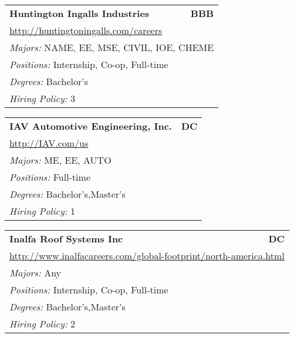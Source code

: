 \documentclass[twoside]{article}
\begin{document}
\begin{center}
\begin{multicols}{3}
\begin{FlushLeft}
\begin{minipage}{.9\columnwidth}
\end{minipage}
 
\begin{minipage}{.9\columnwidth}\begin{tabularx}{.95\columnwidth}{Xr}
                 {\Large\bf Huntington Ingalls Industries} & {\Large\bf BBB}\\
    \multicolumn{2}{p{.95\columnwidth}}{\url{http://huntingtoningalls.com/careers}}\\
    \multicolumn{2}{p{.95\columnwidth}}{\emph{Majors:} NAME, EE, MSE, CIVIL, IOE, CHEME}\\
    \multicolumn{2}{p{.95\columnwidth}}{\emph{Positions:} Internship, Co-op, Full-time}\\
    \multicolumn{2}{p{.95\columnwidth}}{\emph{Degrees:} Bachelor's}\\
    \multicolumn{2}{p{.95\columnwidth}}{\emph{Hiring Policy:} 3}\\
    \end{tabularx}
    
\end{minipage}
 
\begin{minipage}{.9\columnwidth}\begin{tabularx}{.95\columnwidth}{Xr}
                 {\Large\bf IAV Automotive Engineering, Inc.} & {\Large\bf DC}\\
    \multicolumn{2}{p{.95\columnwidth}}{\url{http://IAV.com/us}}\\
    \multicolumn{2}{p{.95\columnwidth}}{\emph{Majors:} ME, EE, AUTO}\\
    \multicolumn{2}{p{.95\columnwidth}}{\emph{Positions:} Full-time}\\
    \multicolumn{2}{p{.95\columnwidth}}{\emph{Degrees:} Bachelor's,Master's}\\
    \multicolumn{2}{p{.95\columnwidth}}{\emph{Hiring Policy:} 1}\\
    \end{tabularx}
    
\end{minipage}
 
\begin{minipage}{.9\columnwidth}\begin{tabularx}{.95\columnwidth}{Xr}
                 {\Large\bf Inalfa Roof Systems Inc} & {\Large\bf DC}\\
    \multicolumn{2}{p{.95\columnwidth}}{\url{http://www.inalfacareers.com/global-footprint/north-america.html}}\\
    \multicolumn{2}{p{.95\columnwidth}}{\emph{Majors:} Any}\\
    \multicolumn{2}{p{.95\columnwidth}}{\emph{Positions:} Internship, Co-op, Full-time}\\
    \multicolumn{2}{p{.95\columnwidth}}{\emph{Degrees:} Bachelor's,Master's}\\
    \multicolumn{2}{p{.95\columnwidth}}{\emph{Hiring Policy:} 2}\\
    \end{tabularx}
    

\end{minipage}
\end{FlushLeft}
\end{multicols}
\end{center}
\end{document}
